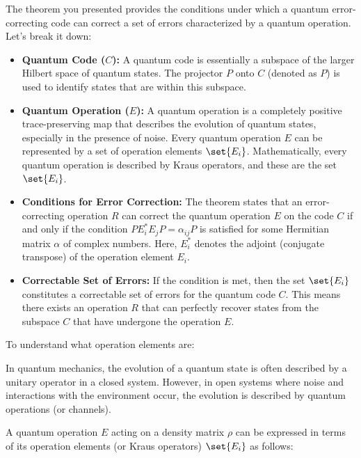 \begin{airesult}
\vsp

The theorem you presented provides the conditions under which a quantum error-correcting code can
correct a set of errors characterized by a quantum operation. Let's break it down:

\begin{itemize}
  \item \textbf{Quantum Code ($C$):} A quantum code is essentially a subspace of the larger Hilbert
space of quantum states. The projector $P$ onto $C$ (denoted as $P$) is used to identify states that
are within this subspace.

  \item \textbf{Quantum Operation ($E$):} A quantum operation is a completely positive
trace-preserving map that describes the evolution of quantum states, especially in the presence of
noise. Every quantum operation $E$ can be represented by a set of operation elements $\set{E_i}$.
Mathematically, every quantum operation is described by Kraus operators, and these are the set
$\set{E_i}$.

  \item \textbf{Conditions for Error Correction:} The theorem states that an error-correcting
operation $R$ can correct the quantum operation $E$ on the code $C$ if and only if the condition $P
E^{*}_i E_j P = \alpha_{ij} P$ is satisfied for some Hermitian matrix $\alpha$ of complex numbers.
Here, $E^{*}_i$ denotes the adjoint (conjugate transpose) of the operation element $E_i$.

  \item \textbf{Correctable Set of Errors:} If the condition is met, then the set $\set{E_i}$
constitutes a correctable set of errors for the quantum code $C$. This means there exists an
operation $R$ that can perfectly recover states from the subspace $C$ that have undergone the
operation $E$.

\end{itemize}

\vsp

To understand what operation elements are:

\vsp

In quantum mechanics, the evolution of a quantum state is often described by a unitary operator in a
closed system. However, in open systems where noise and interactions with the environment occur, the
evolution is described by quantum operations (or channels).

A quantum operation $E$ acting on a density matrix $\rho$ can be expressed in terms of its operation
elements (or Kraus operators) $\set{E_i}$ as follows:


\end{airesult}
